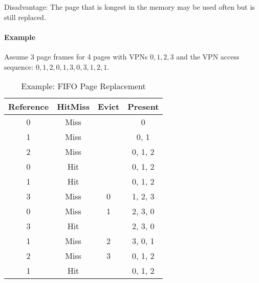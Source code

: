             Disadvantage: The page that is longest in the memory may be used often but is still replaced.
            
            \paragraph{Example}
                Assume 3 page frames for 4 pages with VPNs \( 0, 1, 2, 3 \) and the VPN access sequence: \( 0, 1, 2, 0, 1, 3, 0, 3, 1, 2, 1 \).
                \begin{table}[H]
                	\centering
                	\begin{tabular}{c|c|c|c}
                		\textbf{Reference} & \textbf{Hit}\textbf{Miss} & \textbf{Evict} & \textbf{Present} \\ \hline
                		        0          &           Miss            &                &        0         \\
                		        1          &           Miss            &                &       0, 1       \\
                		        2          &           Miss            &                &     0, 1, 2      \\
                		        0          &            Hit            &                &     0, 1, 2      \\
                		        1          &            Hit            &                &     0, 1, 2      \\
                		        3          &           Miss            &       0        &     1, 2, 3      \\
                		        0          &           Miss            &       1        &     2, 3, 0      \\
                		        3          &            Hit            &                &     2, 3, 0      \\
                		        1          &           Miss            &       2        &     3, 0, 1      \\
                		        2          &           Miss            &       3        &     0, 1, 2      \\
                		        1          &            Hit            &                &     0, 1, 2
                	\end{tabular}
                	\caption{Example: FIFO Page Replacement}
                \end{table}

